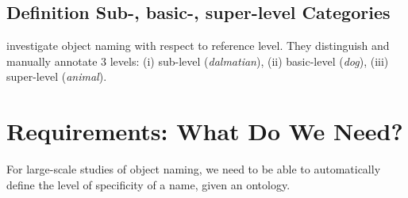 

	


\subsection{Definition Sub-, basic-, super-level Categories}
\cite{graf2016animal} investigate object naming with respect to reference level. They distinguish and manually annotate 3 levels: (i) sub-level (\textit{dalmatian}), (ii) basic-level (\textit{dog}), (iii) super-level (\textit{animal}).

\section{Requirements: What Do We Need? }
For large-scale studies of object naming, we need to be able to automatically define the level of specificity of a name, given an ontology. 